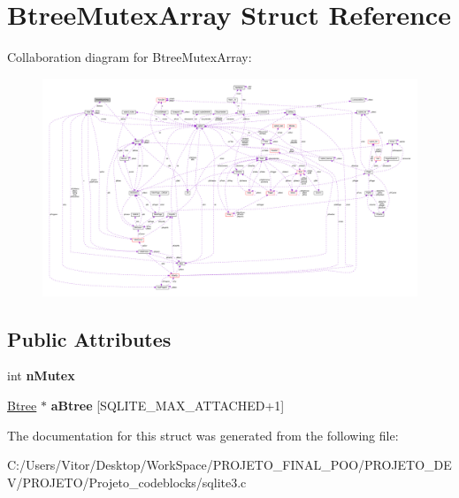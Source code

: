 \hypertarget{struct_btree_mutex_array}{\section{Btree\-Mutex\-Array Struct Reference}
\label{struct_btree_mutex_array}
}


Collaboration diagram for Btree\-Mutex\-Array\-:\nopagebreak
\begin{figure}[H]
\begin{center}
\leavevmode
\includegraphics[width=350pt]{struct_btree_mutex_array__coll__graph}
\end{center}
\end{figure}
\subsection*{Public Attributes}
\begin{DoxyCompactItemize}
\item 
\hypertarget{struct_btree_mutex_array_a1c1e4c51a9ed52ea59152831bf7fc442}{int {\bfseries n\-Mutex}}\label{struct_btree_mutex_array_a1c1e4c51a9ed52ea59152831bf7fc442}

\item 
\hypertarget{struct_btree_mutex_array_ac5bbf3594cd584c88df9cb25731e26dc}{\hyperlink{struct_btree}{Btree} $\ast$ {\bfseries a\-Btree} \mbox{[}S\-Q\-L\-I\-T\-E\-\_\-\-M\-A\-X\-\_\-\-A\-T\-T\-A\-C\-H\-E\-D+1\mbox{]}}\label{struct_btree_mutex_array_ac5bbf3594cd584c88df9cb25731e26dc}

\end{DoxyCompactItemize}


The documentation for this struct was generated from the following file\-:\begin{DoxyCompactItemize}
\item 
C\-:/\-Users/\-Vitor/\-Desktop/\-Work\-Space/\-P\-R\-O\-J\-E\-T\-O\-\_\-\-F\-I\-N\-A\-L\-\_\-\-P\-O\-O/\-P\-R\-O\-J\-E\-T\-O\-\_\-\-D\-E\-V/\-P\-R\-O\-J\-E\-T\-O/\-Projeto\-\_\-codeblocks/sqlite3.\-c\end{DoxyCompactItemize}
